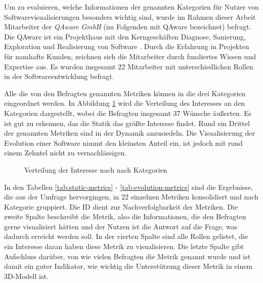 Um zu evaluieren, welche Informationen der genannten Kategorien für Nutzer von Softwarevisualisierungen besonders wichtig sind, wurde im Rahmen dieser Arbeit Mitarbeiter der \textit{QAware GmbH} (im Folgenden mit QAware bezeichnet) befragt. Die QAware ist ein Projekthaus mit den Kerngeschäften Diagnose, Sanierung, Exploration und Realisierung von Software \cite{qaware2017it-probleme}. Durch die Erfahrung in Projekten für namhafte Kunden, zeichnen sich die Mitarbeiter durch fundiertes Wissen und Expertise aus. Es wurden insgesamt 22 Mitarbeiter mit unterschiedlichen Rollen in der Softwareentwicklung befragt.

Alle die von den Befragten genannten Metriken können in die drei Kategorien eingeordnet werden. In Abbildung \ref{fig:cathegories} wird die Verteilung des Interesses an den Kategorien dargestellt, wobei die Befragten insgesamt 37 Wünsche äußerten. Es ist gut zu erkennen, das die Statik das größte Interesse findet. Rund ein Drittel der genannten Metriken sind in der Dynamik anzusiedeln. Die Visualisierung der Evolution einer Software nimmt den kleinsten Anteil ein, ist jedoch mit rund einem Zehntel nicht zu vernachlässigen.

\begin{figure}[htbp]
\centering
{}
\caption{Verteilung der Interesse nach nach Kategorien}
\label{fig:cathegories}
\end{figure}

In den Tabellen \ref{tab:static-metrics} - \ref{tab:evolution-metrics} sind die Ergebnisse, die aus der Umfrage hervorgingen, in 22 einzelnen Metriken konsolidiert und nach Kategorie gruppiert. Die ID dient zur Nachverfolgbarkeit der Metriken. Die zweite Spalte beschreibt die Metrik, also die Informationen, die den Befragten gerne visualisiert hätten und der Nutzen ist die Antwort auf die Frage, was dadurch erreicht werden soll. In der vierten Spalte sind alle Rollen gelistet, die ein Interesse daran haben diese Metrik zu visualisieren. Die letzte Spalte gibt Aufschluss darüber, von wie vielen Befragten die Metrik genannt wurde und ist damit ein guter Indikator, wie wichtig die Unterstützung dieser Metrik in einem 3D-Modell ist.

